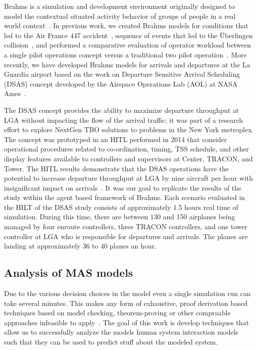 \documentclass[12pt]{article}
\begin{document}
Brahms is a simulation and development environment originally designed
to model the contextual situated activity behavior of groups of people
in a real world context~\cite{clancey1998brahms,SierhuisPhD}. In previous work, we created Brahms models for conditions that led to the Air France 447 accident~\cite{hunter:aamas13}, sequence of events that led to the \"{U}berlingen collision~\cite{Rungta:2013}, and performed a comparative evaluation of operator workload between a single pilot operations concept versus a traditional two pilot operation~\cite{Stocker:2015}. More recently, we have developed Brahms models for arrivals and departures at the La Guardia airport based on the work on Departure Sensitive Arrival Scheduling (DSAS) concept developed by the Airspace Operations Lab (AOL) at NASA Ames~\cite{dsas}. 

The DSAS concept provides the ability to maximize departure throughput at LGA without impacting the flow of the arrival traffic; it was part of a research effort to explore NextGen TBO solutions to problems in the New York metroplex. The concept was prototyped in an HITL performed in 2014 that consider operational procedures related to co-ordination, timing, TSS schedule, and other display features available to controllers and supervisors at Center, TRACON, and Tower. The HITL results demonstrate that the DSAS operations have the potential to increase departure throughput at LGA by nine aircraft per hour with insignificant impact on arrivals~\cite{dsas}.  It was our goal to replicate the results of the study within the agent based framework of Brahms. Each scenario evaluated in the HILT of the DSAS study consists of approximately 1.5 hours real time of simulation. During this time, there are between 130 and 150 airplanes being managed by four enroute controllers, three TRACON controllers, and one tower controller at LGA who is responsible for departures and arrivals. The planes are landing at approximately 36 to 40 planes an hour. 

\subsection{Analysis of MAS models} 
Due to the various decision choices in the model even a single simulation run can take several minutes. This makes any form of exhaustive, proof derivation based techniques based on model checking, theorem-proving or other compraable approaches infeasible to apply~\cite{hunter:aamas13,raimondi:aamas14}. The goal of this work is develop techniques that allow us to successfully analyze the models human system interaction models such that they can be used to predict stuff about the modeled system. 
\end{document}
